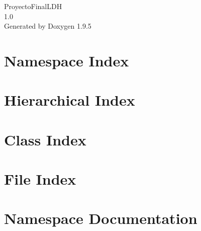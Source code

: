 \documentclass[twoside]{book}
\newcommand{\+}{\discretionary{\mbox{\scriptsize$\hookleftarrow$}}{}{}}
\newcommand{\clearemptydoublepage}{%
    \newpage{\pagestyle{empty}\cleardoublepage}%
  }
\begin{document}
  \raggedbottom
    \hypersetup{pageanchor=false,
                bookmarksnumbered=true,
                pdfencoding=unicode
               }
  \begin{titlepage}
  \vspace*{7cm}
  \begin{center}%
  {\Large Proyecto\+Final\+LDH}\\
  [1ex]\large 1.\+0 \\
  \vspace*{1cm}
  {\large Generated by Doxygen 1.9.5}\\
  \end{center}
  \end{titlepage}
  \clearemptydoublepage
  \tableofcontents
  \clearemptydoublepage
  \hypersetup{pageanchor=true}
\chapter{Namespace Index}

\chapter{Hierarchical Index}

\chapter{Class Index}

\chapter{File Index}

\chapter{Namespace Documentation}








\end{document}
